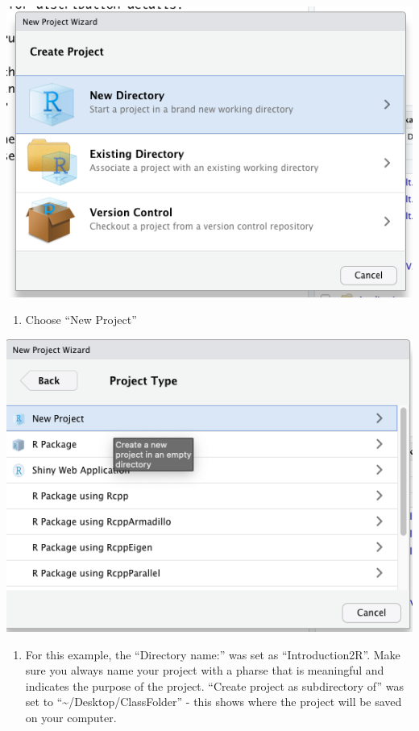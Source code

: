 \documentclass[
]{book}
\providecommand{\tightlist}{%
  \setlength{\itemsep}{0pt}\setlength{\parskip}{0pt}}
\begin{document}
\begin{center}\includegraphics[width=0.7\linewidth]{img/Project2} \end{center}

\begin{enumerate}
\def\labelenumi{\arabic{enumi}.}
\setcounter{enumi}{2}
\tightlist
\item
  Choose ``New Project''
\end{enumerate}

\begin{center}\includegraphics[width=0.7\linewidth]{img/Project3} \end{center}

\begin{enumerate}
\def\labelenumi{\arabic{enumi}.}
\setcounter{enumi}{3}
\tightlist
\item
  For this example, the ``Directory name:'' was set as ``Introduction2R''. Make sure you always name your project with a pharse that is meaningful and indicates the purpose of the project. ``Create project as subdirectory of'' was set to ``\textasciitilde/Desktop/ClassFolder'' - this shows where the project will be saved on your computer.
\end{enumerate}
\end{document}
